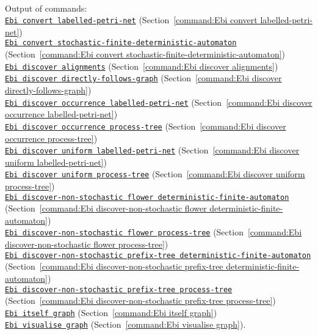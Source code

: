 {\\Output of commands: \\\null\qquad\hyperref[command:Ebi convert labelled-petri-net]{\texttt{Ebi convert labelled-petri-net}} (Section~\ref{command:Ebi convert labelled-petri-net})\\\null\qquad\hyperref[command:Ebi convert stochastic-finite-deterministic-automaton]{\texttt{Ebi convert stochastic-finite-deterministic-automaton}} (Section~\ref{command:Ebi convert stochastic-finite-deterministic-automaton})\\\null\qquad\hyperref[command:Ebi discover alignments]{\texttt{Ebi discover alignments}} (Section~\ref{command:Ebi discover alignments})\\\null\qquad\hyperref[command:Ebi discover directly-follows-graph]{\texttt{Ebi discover directly-follows-graph}} (Section~\ref{command:Ebi discover directly-follows-graph})\\\null\qquad\hyperref[command:Ebi discover occurrence labelled-petri-net]{\texttt{Ebi discover occurrence labelled-petri-net}} (Section~\ref{command:Ebi discover occurrence labelled-petri-net})\\\null\qquad\hyperref[command:Ebi discover occurrence process-tree]{\texttt{Ebi discover occurrence process-tree}} (Section~\ref{command:Ebi discover occurrence process-tree})\\\null\qquad\hyperref[command:Ebi discover uniform labelled-petri-net]{\texttt{Ebi discover uniform labelled-petri-net}} (Section~\ref{command:Ebi discover uniform labelled-petri-net})\\\null\qquad\hyperref[command:Ebi discover uniform process-tree]{\texttt{Ebi discover uniform process-tree}} (Section~\ref{command:Ebi discover uniform process-tree})\\\null\qquad\hyperref[command:Ebi discover-non-stochastic flower deterministic-finite-automaton]{\texttt{Ebi discover-non-stochastic flower deterministic-finite-automaton}} (Section~\ref{command:Ebi discover-non-stochastic flower deterministic-finite-automaton})\\\null\qquad\hyperref[command:Ebi discover-non-stochastic flower process-tree]{\texttt{Ebi discover-non-stochastic flower process-tree}} (Section~\ref{command:Ebi discover-non-stochastic flower process-tree})\\\null\qquad\hyperref[command:Ebi discover-non-stochastic prefix-tree deterministic-finite-automaton]{\texttt{Ebi discover-non-stochastic prefix-tree deterministic-finite-automaton}} (Section~\ref{command:Ebi discover-non-stochastic prefix-tree deterministic-finite-automaton})\\\null\qquad\hyperref[command:Ebi discover-non-stochastic prefix-tree process-tree]{\texttt{Ebi discover-non-stochastic prefix-tree process-tree}} (Section~\ref{command:Ebi discover-non-stochastic prefix-tree process-tree})\\\null\qquad\hyperref[command:Ebi itself graph]{\texttt{Ebi itself graph}} (Section~\ref{command:Ebi itself graph})\\\null\qquad\hyperref[command:Ebi visualise graph]{\texttt{Ebi visualise graph}} (Section~\ref{command:Ebi visualise graph}).
}
